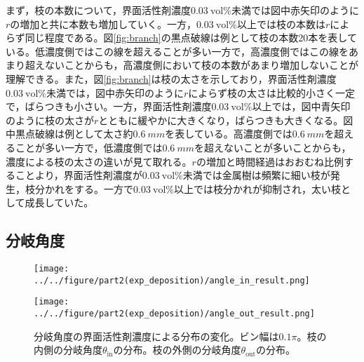 \documentclass[autodetect-engine,dvi=dvipdfmx,a4paper,ja=standard,oneside,openany,11pt]{bxjsbook}
\begin{document}
まず，枝の本数について，界面活性剤濃度$\SI{0.03}{\mathrm{vol}\%}$未満では図中赤矢印のように$r$の増加と共に本数も増加していく。一方，$\SI{0.03}{\mathrm{vol}\%}$以上では枝の本数は$r$によらず同じ程度である。図\ref{fig:branch}の黒点破線は例として枝の本数20本を表している。低濃度側ではこの線を超えることが多い一方で，高濃度側ではこの線をあまり超えないことからも，高濃度側において枝の本数があまり増加しないことが理解できる。また，図\ref{fig:branch}は枝の太さを示しており，界面活性剤濃度$\SI{0.03}{\mathrm{vol}\%}$未満では，図中赤矢印のように$r$によらず枝の太さは比較的小さく一定で，ばらつきも小さい。一方，界面活性剤濃度$\SI{0.03}{\mathrm{vol}\%}$以上では，図中青矢印のように枝の太さが$r$とともに緩やかに大きくなり，ばらつきも大きくなる。図中黒点破線は例として太さ約$\SI{0.6}{mm}$を表している。高濃度側では$\SI{0.6}{mm}$を超えることが多い一方で，低濃度側では$\SI{0.6}{mm}$を超えないことが多いことからも，濃度による枝の太さの違いが見て取れる。$r$の増加と時間経過はおおむね比例することより，界面活性剤濃度が$\SI{0.03}{\mathrm{vol}\%}$未満では金属樹は頻繁に細い枝が発生，枝分かれをする。一方で$\SI{0.03}{\mathrm{vol}\%}$以上では枝分かれが抑制され，太い枝として成長していた。

\subsection{分岐角度}

\begin{figure}[htbp]
  \begin{minipage}
    {0.5\textwidth}
    \subcaption{}
    \centering
    \texttt{[image: ../../figure/part2(exp\_deposition)/angle\_in\_result.png]}
    \label{fig:angle_in}
  \end{minipage}
  \begin{minipage}
    {0.45\textwidth}
    \subcaption{}
    \centering
    \texttt{[image: ../../figure/part2(exp\_deposition)/angle\_out\_result.png]}
    \label{fig:angle_out}
  \end{minipage}
  \caption{分岐角度の界面活性剤濃度による分布の変化。ビン幅は$0.1\pi$。枝の内側の分岐角度$\theta_{\mathrm{in}}$の分布。枝の外側の分岐角度$\theta_{\mathrm{out}}$の分布。}
  \label{fig:angle}
\end{figure}
\end{document}
